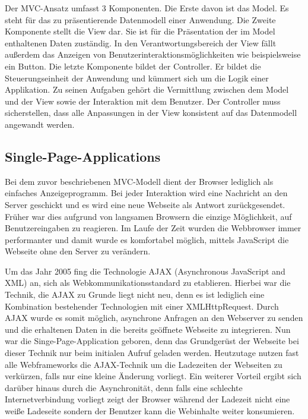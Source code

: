 Der MVC-Ansatz umfasst 3 Komponenten. Die Erste davon ist das Model. Es steht für das zu präsentierende Datenmodell einer Anwendung. Die Zweite Komponente stellt die View dar. Sie ist für die Präsentation der im Model enthaltenen Daten zuständig. In den Verantwortungsbereich der View fällt außerdem das Anzeigen von Benutzerinteraktionsmöglichkeiten wie beispielsweise ein Button. Die letzte Komponente bildet der Controller. Er bildet die Steuerungseinheit der Anwendung und kümmert sich um die Logik einer Applikation. Zu seinen Aufgaben gehört die Vermittlung zwischen dem Model und der View sowie der Interaktion mit dem Benutzer. Der Controller muss sicherstellen, dass alle Anpassungen in der View konsistent auf das Datenmodell angewandt werden.\autocites[vgl.][7\psqq]{Magnucki2017}

\subsection{Single-Page-Applications}

Bei dem zuvor beschriebenen MVC-Modell dient der Browser lediglich als einfaches Anzeigeprogramm. Bei jeder Interaktion wird eine Nachricht an den Server geschickt und es wird eine neue Webseite als Antwort zurückgesendet. Früher war dies aufgrund von langsamen Browsern die einzige Möglichkeit, auf Benutzereingaben zu reagieren. Im Laufe der Zeit wurden die Webbrowser immer performanter und damit wurde es komfortabel möglich, mittels JavaScript die Webseite ohne den Server zu verändern. 

Um das Jahr 2005 fing die Technologie AJAX (Asynchronous JavaScript and XML) an, sich als Webkommunikationsstandard zu etablieren. Hierbei war die Technik, die AJAX zu Grunde liegt nicht neu, denn es ist lediglich eine Kombination bestehender Technologien mit einer XMLHttpRequest. Durch AJAX wurde es somit möglich, asynchrone Anfragen an den Webserver zu senden und die erhaltenen Daten in die bereits geöffnete Webseite zu integrieren. Nun war die Singe-Page-Application geboren, denn das Grundgerüst der Webseite bei dieser Technik nur beim initialen Aufruf geladen werden. Heutzutage nutzen fast alle Webframeworks die AJAX-Technik um die Ladezeiten der Webseiten zu verkürzen, falls nur eine kleine Änderung vorliegt. Ein weiterer Vorteil ergibt sich darüber hinaus durch die Asynchronität, denn falls eine schlechte Internetverbindung vorliegt zeigt der Browser während der Ladezeit nicht eine weiße Ladeseite sondern der Benutzer kann die Webinhalte weiter konsumieren.\autocites[vgl.][4]{Fink2014}

